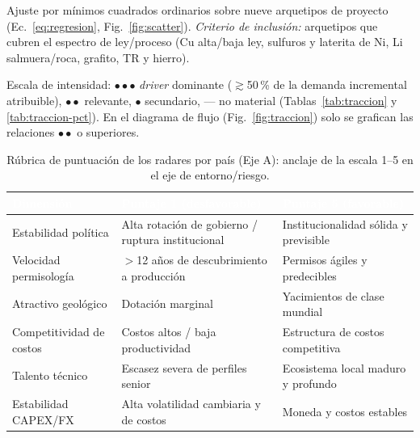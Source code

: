 \documentclass[11pt,letterpaper]{report}
\begin{document}
\begin{description}[leftmargin=2.6em,style=nextline]
\item[C6 --- Correlación ley $\leftrightarrow$ CAPEX (Eje E).] Ajuste por mínimos cuadrados ordinarios sobre nueve arquetipos de
  proyecto (Ec.~\ref{eq:regresion}, Fig.~\ref{fig:scatter}). \emph{Criterio de inclusión:} arquetipos que cubren el espectro de
  ley/proceso (Cu alta/baja ley, sulfuros y laterita de Ni, Li salmuera/roca, grafito, TR y hierro).
\item[C7 --- Tracción tecnología $\times$ mineral (Eje C).] Escala de intensidad: $\bullet\bullet\bullet$ \emph{driver} dominante
  ($\gtrsim$50\,\% de la demanda incremental atribuible), $\bullet\bullet$ relevante, $\bullet$ secundario, --- no material
  (Tablas~\ref{tab:traccion} y \ref{tab:traccion-pct}). En el diagrama de flujo (Fig.~\ref{fig:traccion}) solo se grafican las
  relaciones $\bullet\bullet$ o superiores.
\end{description}

\begin{table}[htbp]
\centering
\caption{Rúbrica de puntuación de los radares por país (Eje A): anclaje de la escala 1--5 en el eje de entorno/riesgo.}
\label{tab:rubrica}
\footnotesize
\renewcommand{\arraystretch}{1.25}
\begin{tabularx}{\textwidth}{@{}lXX@{}}
\toprule
\rowcolor{tablehead}\textcolor{white}{\textbf{Dimensión}} & \textcolor{white}{\textbf{Puntaje 1 (desfavorable)}} &
\textcolor{white}{\textbf{Puntaje 5 (favorable)}}\\
\midrule
Estabilidad política & Alta rotación de gobierno / ruptura institucional & Institucionalidad sólida y previsible\\
\rowcolor{tablealt}Velocidad permisología & $>$12 años de descubrimiento a producción & Permisos ágiles y predecibles\\
Atractivo geológico & Dotación marginal & Yacimientos de clase mundial\\
\rowcolor{tablealt}Competitividad de costos & Costos altos / baja productividad & Estructura de costos competitiva\\
Talento técnico & Escasez severa de perfiles senior & Ecosistema local maduro y profundo\\
\rowcolor{tablealt}Estabilidad CAPEX/FX & Alta volatilidad cambiaria y de costos & Moneda y costos estables\\
\bottomrule
\end{tabularx}
\end{table}
\end{document}
